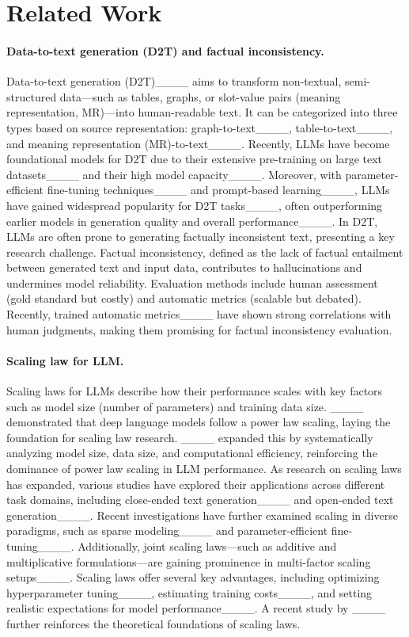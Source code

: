 \section{Related Work}
\label{sec:background}
\paragraph{Data-to-text generation (D2T) and factual inconsistency.}
Data-to-text generation (D2T)____ aims to transform non-textual, semi-structured data---such as tables, graphs, or slot-value pairs (meaning representation, MR)---into human-readable text.
It can be categorized into three types based on source representation: graph-to-text____, table-to-text____, and meaning representation (MR)-to-text____.
Recently, LLMs have become foundational models for D2T due to their extensive pre-training on large text datasets____ and their high model capacity____.
Moreover, with parameter-efficient fine-tuning techniques____ and prompt-based learning____, LLMs have gained widespread popularity for D2T tasks____, often outperforming earlier models in generation quality and overall performance____.
In D2T, LLMs are often prone to generating factually inconsistent text, presenting a key research challenge. 
Factual inconsistency, defined as the lack of factual entailment between generated text and input data, contributes to hallucinations and undermines model reliability.
Evaluation methods include human assessment (gold standard but costly) and automatic metrics (scalable but debated).
Recently, trained automatic metrics____ have shown strong correlations with human judgments, making them promising for factual inconsistency evaluation.

\paragraph{Scaling law for LLM.}
Scaling laws for LLMs describe how their performance scales with key factors such as model size (number of parameters) and training data size.  
____ demonstrated that deep language models follow a power law scaling, laying the foundation for scaling law research.
____ expanded this by systematically analyzing model size, data size, and computational efficiency, reinforcing the dominance of power law scaling in LLM performance. 
As research on scaling laws has expanded, various studies have explored their applications across different task domains, including close-ended text generation____ and open-ended text generation____.  
Recent investigations have further examined scaling in diverse paradigms, such as sparse modeling____ and parameter-efficient fine-tuning____.  
Additionally, joint scaling laws---such as additive and multiplicative formulations---are gaining prominence in multi-factor scaling setups____.  
Scaling laws offer several key advantages, including optimizing hyperparameter tuning____, estimating training costs____, and setting realistic expectations for model performance____. 
A recent study by ____ further reinforces the theoretical foundations of scaling laws.